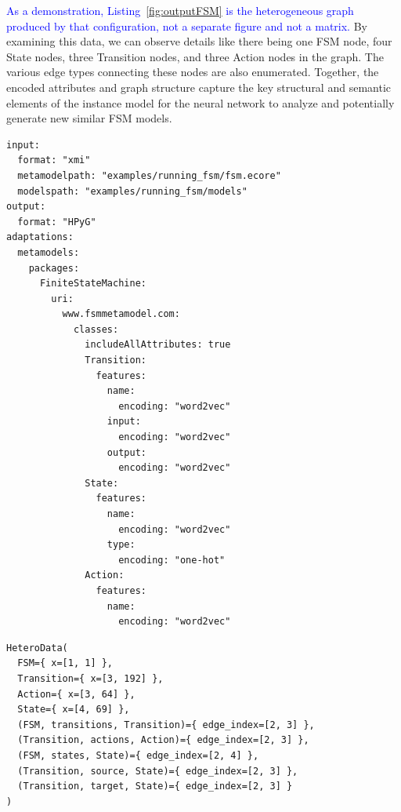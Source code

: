 \documentclass[journal,article,submit,moreauthors,technologies]{Definitions/mdpi}
\newcommand{\rev}[1]{\textcolor{blue}{#1}}
\begin{document}
\rev{As a demonstration, Listing~\ref{fig:outputFSM} is the heterogeneous graph produced by that configuration, not a separate figure and not a matrix.} By examining this data, we can observe details like there being one FSM node, four State nodes, three Transition nodes, and three Action nodes in the graph. The various edge types connecting these nodes are also enumerated. Together, the encoded attributes and graph structure capture the key structural and semantic elements of the instance model for the neural network to analyze and potentially generate new similar FSM models.

\begin{program_}[H]
\footnotesize

\begin{verbatim}
input:
  format: "xmi"
  metamodelpath: "examples/running_fsm/fsm.ecore"
  modelspath: "examples/running_fsm/models"
output:
  format: "HPyG"
adaptations:
  metamodels:
    packages:
      FiniteStateMachine:
        uri:
          www.fsmmetamodel.com:
            classes:
              includeAllAttributes: true
              Transition:
                features:
                  name:
                    encoding: "word2vec"
                  input:
                    encoding: "word2vec"
                  output:
                    encoding: "word2vec"
              State:
                features:
                  name:
                    encoding: "word2vec"
                  type:
                    encoding: "one-hot"
              Action:
                features:
                  name:
                    encoding: "word2vec"
\end{verbatim}
\caption{\rev{Attribute encoding for the running example. The class is \texttt{Transition}, and every \texttt{encoding} key has its colon.}}
\label{code:YamlFSMattributes}
\end{program_}


\begin{program_}[H]
\footnotesize
\begin{verbatim}
HeteroData(
  FSM={ x=[1, 1] },
  Transition={ x=[3, 192] },
  Action={ x=[3, 64] },
  State={ x=[4, 69] },
  (FSM, transitions, Transition)={ edge_index=[2, 3] },
  (Transition, actions, Action)={ edge_index=[2, 3] },
  (FSM, states, State)={ edge_index=[2, 4] },
  (Transition, source, State)={ edge_index=[2, 3] },
  (Transition, target, State)={ edge_index=[2, 3] }
)
\end{verbatim}
\caption{\rev{The heterogeneous graph produced by running Listing~\ref{code:YamlFSMattributes}. Each \texttt{x} shape is (number of nodes, feature width). The State width 69 is a 64-dimensional name vector, the raw timeout and a 4-dimensional one-hot. For state1, \texttt{type=Initial} encodes as $[0, 1, 0, 0]$ (vocabulary Final, Initial, Intermediate, plus an unknown bin) and timeout is the raw value 1. The name coordinates stay at the untrained initialisation of Section~\ref{sec:avalues} and are not printed.}}
\label{fig:outputFSM}
\end{program_}
\end{document}
